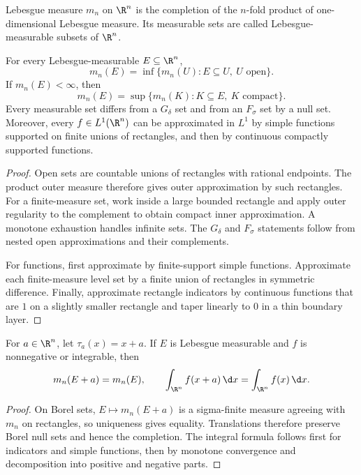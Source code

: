 \begin{de}
Lebesgue measure $m_n$ on $\R^n$ is the completion of the $n$-fold product of one-dimensional Lebesgue measure. Its measurable sets are called Lebesgue-measurable subsets of $\R^n$.
\end{de}

\begin{thm}
For every Lebesgue-measurable $E\subseteq\R^n$,
\[
m_n(E)=\inf\{m_n(U):E\subseteq U,\ U\text{ open}\}.
\]
If $m_n(E)<\infty$, then
\[
m_n(E)=\sup\{m_n(K):K\subseteq E,\ K\text{ compact}\}.
\]
Every measurable set differs from a $G_\delta$ set and from an $F_\sigma$ set by a null set. Moreover, every $f\in L^1(\R^n)$ can be approximated in $L^1$ by simple functions supported on finite unions of rectangles, and then by continuous compactly supported functions.
\end{thm}

\begin{proof}
Open sets are countable unions of rectangles with rational endpoints. The product outer measure therefore gives outer approximation by such rectangles. For a finite-measure set, work inside a large bounded rectangle and apply outer regularity to the complement to obtain compact inner approximation. A monotone exhaustion handles infinite sets. The $G_\delta$ and $F_\sigma$ statements follow from nested open approximations and their complements.

For functions, first approximate by finite-support simple functions. Approximate each finite-measure level set by a finite union of rectangles in symmetric difference. Finally, approximate rectangle indicators by continuous functions that are $1$ on a slightly smaller rectangle and taper linearly to $0$ in a thin boundary layer.
\end{proof}

\begin{thm}
For $a\in\R^n$, let $\tau_a(x)=x+a$. If $E$ is Lebesgue measurable and $f$ is nonnegative or integrable, then
\[
m_n(E+a)=m_n(E),
\qquad
\int_{\R^n}f(x+a)\,\d x=
\int_{\R^n}f(x)\,\d x.
\]
\end{thm}

\begin{proof}
On Borel sets, $E\mapsto m_n(E+a)$ is a sigma-finite measure agreeing with $m_n$ on rectangles, so uniqueness gives equality. Translations therefore preserve Borel null sets and hence the completion. The integral formula follows first for indicators and simple functions, then by monotone convergence and decomposition into positive and negative parts.
\end{proof}

